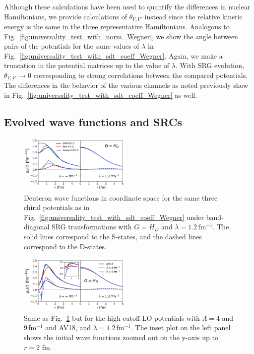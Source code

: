\documentclass[10pt,aps,prc,floatfix,twocolumn,nofootinbib]{revtex4-1}
\begin{document}
Although these calculations have been used to quantify the differences in nuclear Hamiltonians, we provide calculations of $\theta_{V,V'}$ instead since the relative kinetic energy is the same in the three representative Hamiltonians.
Analogous to Fig.~\ref{fig:universality_test_with_norm_Wegner}, we show the angle between pairs of the potentials for the same values of $\lambda$ in Fig.~\ref{fig:universality_test_with_sdt_coeff_Wegner}.
Again, we make a truncation in the potential matrices up to the value of $\lambda$.
With SRG evolution, $\theta_{V,V'} \rightarrow 0$ corresponding to strong correlations between the compared potentials.
The differences in the behavior of the various channels as noted previously show in Fig.~\ref{fig:universality_test_with_sdt_coeff_Wegner} as well.


\subsection{Evolved wave functions and SRCs}
\label{subsec:wfs_and_SRCs}

%
\begin{figure}[t!]
    \includegraphics[clip,width=0.48\textwidth]{deuteron_wave_func_coord_space_kvnns_79_111_222_Wegner1,2.pdf}%
    \caption{Deuteron wave functions in coordinate space for the same three chiral potentials as in Fig.~\ref{fig:universality_test_with_sdt_coeff_Wegner} under band-diagonal SRG transformations with $G=H_D$ and $\lambda=1.2$\,fm$^{-1}$. The solid lines correspond to the S-states, and the dashed lines correspond to the D-states.}
    \label{fig:deuteron_wave_funcs_soft}
\end{figure}
%
\begin{figure}[tbh]
    \includegraphics[clip,width=0.48\textwidth]{deuteron_wave_func_coord_space_kvnns_6_900_901_Wegner1,2.pdf}%
    \caption{Same as Fig.~\ref{fig:deuteron_wave_funcs_soft} but for the high-cutoff LO potentials with $\Lambda=4$ and $9$\,fm$^{-1}$ and AV18, and $\lambda=1.2$\,fm$^{-1}$. The inset plot on the left panel shows the initial wave functions zoomed out on the y-axis up to $r=2$ fm.}
    \label{fig:deuteron_wave_funcs_hard}
\end{figure}
%
\end{document}
